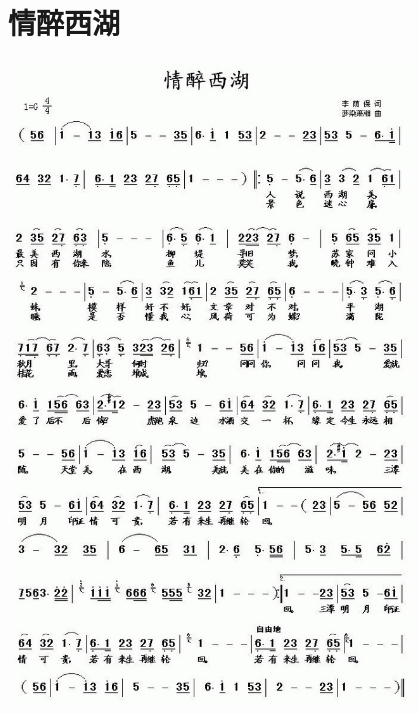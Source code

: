 \documentclass[cn,pad,twocol]{elegantbook}
\begin{document}
\section{情醉西湖} \center
    \includegraphics[width=0.8\textwidth]{dongxiao/20200901-情醉西湖.jpeg}
\end{document}
